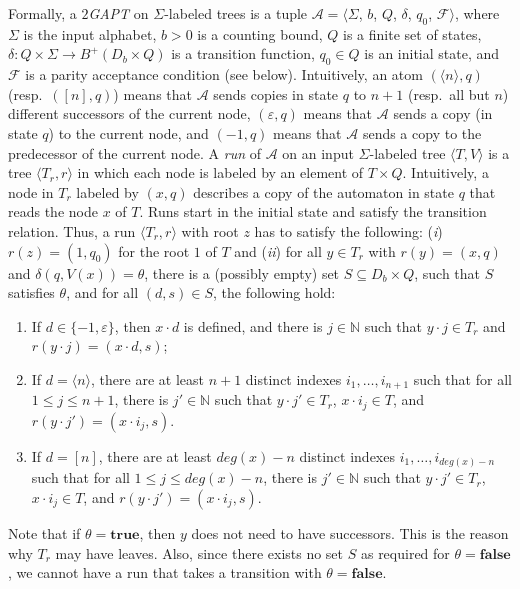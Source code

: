 \documentclass{LMCS}
\theoremstyle{plain}
\def \A             {\mathcal{A}}
\def \degree        {deg}
\def \F             {\mathcal{F}}
\def \Nat           {\mathbb{N}}
\def \TGAPT         {\emph{$2$GAPT}\xspace}
\newcommand \tpl[1] {\langle #1 \rangle}
\begin{document}
Formally, a \TGAPT on $\Sigma$-labeled trees is a tuple $\A = \langle \Sigma$,
$b$, $Q$, $\delta$, $q_0$, $\F \rangle$, where $\Sigma$ is the input alphabet,
$b > 0$ is a counting bound, $Q$ is a finite set of states, $\delta: Q \times
\Sigma \rightarrow B^{+}(D_b \times Q)$ is a transition function, $q_0 \in Q$
is an initial state, and $\F$ is a parity acceptance condition (see below).
Intuitively, an atom $(\tpl{n}, q)$ (resp.\ $([n], q)$) means that $\A$ sends
copies in state $q$ to $n + 1$ (resp.\ all but $n$) different successors of the
current node, $(\varepsilon, q)$ means that $\A$ sends a copy (in state $q$) to
the current node, and $(-1, q)$ means that $\A$ sends a copy to the predecessor
of the current node. A \emph{run} of $\A$ on an input $\Sigma$-labeled tree
$\tpl{T,V}$ is a tree $\tpl{T_r,r}$ in which each node is labeled by an element
of $T \times Q$. Intuitively, a node in $T_r$ labeled by $(x, q)$ describes a
copy of the automaton in state $q$ that reads the node $x$ of $T$. Runs start
in the initial state and satisfy the transition relation. Thus, a run
$\tpl{T_r,r}$ with root $z$ has to satisfy the following: (\emph{i}) $r(z) =
(1, q_0)$ for the root $1$ of $T$ and (\emph{ii}) for all $y \in T_r$ with
$r(y) = (x, q)$ and $\delta(q, V(x)) = \theta$, there is a (possibly empty) set
$S \subseteq D_b \times Q$, such that $S$ satisfies $\theta$, and for all $(d,
s) \in S$, the following hold:

\begin{enumerate}[$\bullet$]
    \item
    If $d \in \{-1, \varepsilon \} $, then $x \cdot d$ is defined, and there is $j
    \in \Nat$ such that $y \cdot j \in T_r$ and $r(y \cdot j) = (x \cdot d, s)$;

    \item
    If $d = \tpl{n}$, there are at least $n+1$ distinct indexes $i_1, \ldots,
    i_{n+1}$ such that for all $1 \leq j \leq n+1$, there is $j' \in \Nat$ such
    that $y \cdot j' \in T_r$, $x\cdot i_j\in T$, and $r(y \cdot j') = (x \cdot
    i_j, s)$.

    \item
    If $d = [n]$, there are at least $\degree(x)-n$ distinct indexes $i_1, \ldots,
    i_{\degree(x)-n}$ such that for all $1 \leq j \leq \degree(x)-n$, there is $j'
    \in \Nat$ such that $y \cdot j' \in T_r$, $x\cdot i_j\in T$, and $r(y \cdot j')
    = (x \cdot i_j, s)$.
\end{enumerate}

Note that if $\theta = \textbf{true}$, then $y$ does not need to
have successors. This is the reason why $T_r$ may have leaves.
Also, since there exists no set $S$ as required for $\theta =
\textbf{false}$, we cannot have a run that takes a transition with
$\theta = \textbf{false}$.
\end{document}
